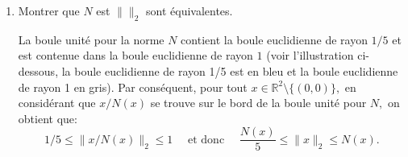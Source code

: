 \documentclass[a4paper]{tp_um}
\begin{document}
\begin{enumerate}
\begin{center}
\begin{tikzpicture}[scale=3]
            \end{tikzpicture}
        \end{center}

	\item Montrer que $N$ est $\|\|_{2}$ sont \'equivalentes.

	\bigskip

La boule unit\'e pour la norme $N$ contient la boule euclidienne de rayon $1/5$ et est contenue dans la boule euclidienne de rayon $1$ (voir l'illustration ci-dessous, la boule euclidienne de rayon 1/5 est en bleu et la boule euclidienne de rayon 1 en gris). Par cons\'equent, pour tout $x \in \mathbb R^2 \setminus \{(0,0)\},$ en consid\'erant que $x/N(x)$ se trouve sur le bord de la boule unit\'e pour $N,$ on obtient que:
$$
  1/5  \leq  \|x /N(x)\|_2    \leq 1 \quad \text{ et donc } \quad
  \dfrac{N(x)}{5} \leq \|x\|_2 \leq N(x). 
$$

        \begin{center}
            
            
        \end{center}

\end{enumerate}

\newpage
\end{document}
